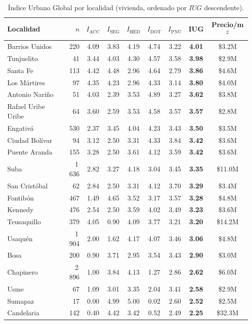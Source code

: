 \documentclass[12pt, a4paper, twoside, openright]{report}
\theoremstyle{plain}
\theoremstyle{definition}
\newcommand{\IHED}{I_{\text{HED}}} %
\newcommand{\IACC}{I_{\text{ACC}}} %
\newcommand{\ISEG}{I_{\text{SEG}}} %
\newcommand{\IDOT}{I_{\text{DOT}}} %
\newcommand{\IPNU}{I_{\text{PNU}}} %
\newcommand{\IUG}{IUG}             %
\begin{document}
\begin{table}[htbp]
\centering
\caption{Índice Urbano Global por localidad (vivienda, ordenado por $\IUG$ descendente).}
\label{tab:iug_localidad_res}
\small
\begin{tabular}{@{}lrccccccc@{}}
\toprule
\textbf{Localidad} & $n$ & $\IACC$ & $\ISEG$ & $\IHED$ &
$\IDOT$ & $\IPNU$ & $\boldsymbol{\IUG}$ & \textbf{Precio/m$^2$} \\
\midrule
Barrios Unidos      &   220 & 4.09 & 3.83 & 4.19 & 4.74 & 3.22 & \textbf{4.01} & \$3.2M \\
Tunjuelito          &    41 & 3.44 & 4.03 & 4.30 & 4.57 & 3.58 & \textbf{3.98} & \$2.9M \\
Santa Fe            &   113 & 4.42 & 4.48 & 2.96 & 4.64 & 2.79 & \textbf{3.86} & \$4.6M \\
Los Mártires        &    97 & 4.35 & 4.23 & 2.96 & 4.33 & 3.14 & \textbf{3.80} & \$4.0M \\
Antonio Nariño      &    51 & 4.03 & 2.39 & 3.53 & 4.89 & 3.27 & \textbf{3.62} & \$3.8M \\
Rafael Uribe Uribe  &    64 & 3.60 & 2.59 & 3.53 & 4.58 & 3.57 & \textbf{3.57} & \$2.8M \\
Engativá            &   530 & 2.37 & 3.45 & 4.04 & 4.23 & 3.43 & \textbf{3.50} & \$3.5M \\
Ciudad Bolívar      &    94 & 3.12 & 2.50 & 3.31 & 4.33 & 3.84 & \textbf{3.42} & \$3.6M \\
Puente Aranda       &   155 & 3.28 & 2.50 & 3.61 & 4.12 & 3.59 & \textbf{3.42} & \$3.6M \\
Suba                & 1\,636 & 2.82 & 3.27 & 4.18 & 3.04 & 3.45 & \textbf{3.35} & \$11.0M \\
San Cristóbal       &    62 & 2.84 & 2.50 & 3.31 & 4.12 & 3.70 & \textbf{3.29} & \$3.4M \\
Fontibón            &   467 & 1.49 & 4.65 & 3.52 & 3.17 & 3.57 & \textbf{3.28} & \$4.8M \\
Kennedy             &   476 & 2.54 & 2.50 & 3.59 & 4.02 & 3.49 & \textbf{3.23} & \$3.6M \\
Teusaquillo         &   379 & 4.05 & 0.90 & 4.09 & 3.77 & 3.21 & \textbf{3.20} & \$14.2M \\
Usaquén             & 1\,904 & 2.00 & 1.62 & 4.17 & 4.07 & 3.46 & \textbf{3.06} & \$4.8M \\
Bosa                &   200 & 0.90 & 3.71 & 2.95 & 3.54 & 3.43 & \textbf{2.90} & \$3.0M \\
Chapinero           & 2\,896 & 1.00 & 3.84 & 4.13 & 1.27 & 2.86 & \textbf{2.62} & \$6.0M \\
Usme                &    67 & 1.09 & 3.01 & 3.35 & 2.04 & 3.41 & \textbf{2.58} & \$2.9M \\
Sumapaz             &    17 & 0.00 & 4.99 & 5.00 & 0.02 & 2.60 & \textbf{2.52} & \$2.5M \\
Candelaria          &   142 & 0.40 & 4.42 & 3.42 & 0.52 & 2.49 & \textbf{2.25} & \$32.3M \\
\bottomrule
\end{tabular}
\end{table}
\end{document}
